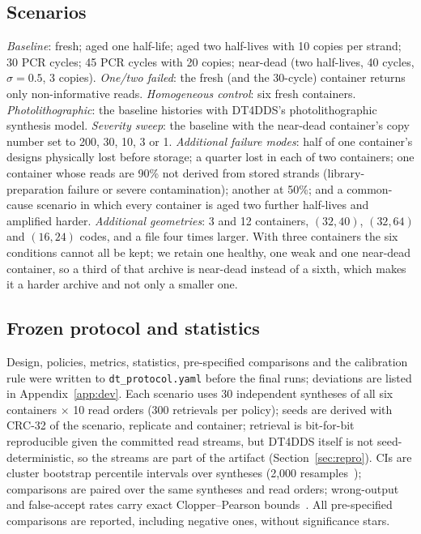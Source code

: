 \documentclass[conference,onecolumn,11pt]{IEEEtran}
\begin{document}
\subsection{Scenarios}
\emph{Baseline}: fresh; aged one half-life; aged two half-lives with 10 copies per strand; 30
PCR cycles; 45 PCR cycles with 20 copies; near-dead (two half-lives, 40 cycles, $\sigma{=}0.5$,
3 copies).  \emph{One/two failed}: the fresh (and the 30-cycle) container returns only
non-informative reads.  \emph{Homogeneous control}: six fresh containers.
\emph{Photolithographic}: the baseline histories with DT4DDS's photolithographic synthesis
model.  \emph{Severity sweep}: the baseline with the near-dead container's copy number set to 200, 30, 10, 3
or 1.  \emph{Additional failure modes}: half of one container's designs physically lost before storage;
a quarter lost in each of two containers; one container whose reads are 90\% not derived from stored
strands (library-preparation failure or severe contamination); another at 50\%; and a common-cause
scenario in which every container is aged two further half-lives and amplified harder.
\emph{Additional geometries}: 3 and 12 containers, $(32,40)$, $(32,64)$ and $(16,24)$ codes, and a file
four times larger.  With three containers the six conditions cannot all be kept; we retain one healthy,
one weak and one near-dead container, so a third of that archive is near-dead instead of a sixth, which
makes it a harder archive and not only a smaller one.

\subsection{Frozen protocol and statistics}
Design, policies, metrics, statistics, pre-specified comparisons and the calibration rule were
written to \texttt{dt\_protocol.yaml} before the final runs; deviations are listed in
Appendix~\ref{app:dev}.  Each scenario uses 30 independent syntheses of all six containers
$\times$ 10 read orders (300 retrievals per policy); seeds are derived with CRC-32 of the
scenario, replicate and container; retrieval is bit-for-bit reproducible given the committed read
streams, but DT4DDS itself is not seed-deterministic, so the streams are part of the artifact
(Section~\ref{sec:repro}).  CIs are cluster
bootstrap percentile intervals over syntheses (2{,}000 resamples~\cite{efron1993introduction});
comparisons are paired over the same syntheses and read orders; wrong-output and false-accept
rates carry exact Clopper--Pearson bounds~\cite{clopper1934use}.  All pre-specified comparisons are
reported, including negative ones, without significance stars.
\end{document}
